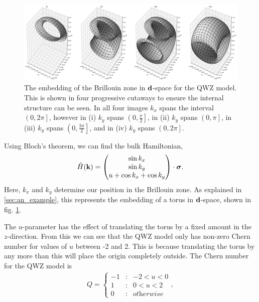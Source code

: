 \begin{figure}[t]
\begin{center}
 \includegraphics[width=\textwidth]{QWZ_donut}
\caption{The embedding of the Brillouin zone in $\bf d$-space for the QWZ model. This is shown in four progressive cutaways to ensure the internal structure can be seen. In all four images $k_x$ spans the interval $\left ( 0, 2\pi \right ]$, however in (i) $k_y$ spans $\left ( 0, \frac{\pi}{2} \right ]$, in (ii) $k_y$ spans $\left ( 0, \pi \right ]$, in (iii) $k_y$ spans $\left ( 0, \frac{3 \pi}{2} \right ]$, and in (iv) $k_y$ spans $\left ( 0, 2\pi \right ]$. }
\label{fig:QWZ_donut}
\end{center}
\end{figure}
Using Bloch's theorem, we can find the bulk Hamiltonian,
\begin{align}
    \hat H(\bf k) = \begin{pmatrix}
\sin k_x \\ 
\sin k_y\\ 
u + \cos k_x+ \cos k_y
\end{pmatrix} \cdot \bm \sigma.
\end{align}
Here, $k_x$ and $k_y$ determine our position in the Brillouin zone. As explained in \textsection\ref{sec:an_example}, this represents the embedding of a torus in $\bf d$-space, shown in fig. \ref{fig:QWZ_donut}.\par
The $u$-parameter has the effect of translating the torus by a fixed amount in the $z$-direction. From this we can see that the QWZ model only has non-zero Chern number for values of $u$ between -2 and 2. This is because translating the torus by any more than this will place the origin completely outside. The Chern number for the QWZ model is
\begin{align}
Q = \left\{\begin{matrix}
-1 &:&  -2 < u < 0 \\ 
1  &:&  0<u<2\\
0  &:&  \textit{otherwise} 
\end{matrix}\right. ,
\end{align}
